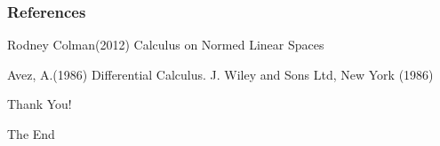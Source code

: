 \documentclass{beamer}
\begin{document}

\begin{frame}
\frametitle{References}
\footnotesize{
\begin{thebibliography}{99} %
 Rodney Colman(2012)
\newblock Calculus on Normed Linear Spaces

 Avez, A.(1986)
\newblock  Differential Calculus. J. Wiley and Sons Ltd, New York (1986)
\end{thebibliography}
}
\end{frame}


\begin{frame}
\Large{\centerline{Thank You!}}
\small{\centerline{The End}}
\end{frame}

\end{document}
